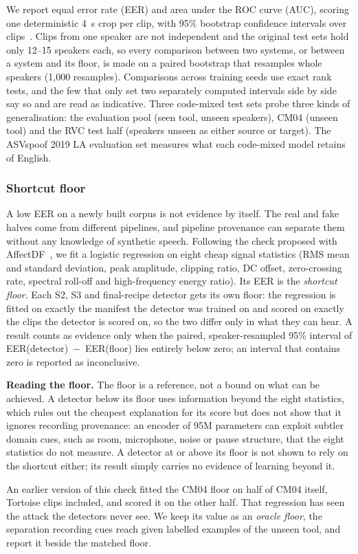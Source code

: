 We report equal error rate (EER) and area under the ROC curve (AUC), scoring one
deterministic 4~s crop per clip, with 95\% bootstrap confidence intervals over
clips~\cite{efron1993bootstrap}. Clips from one speaker are not independent and the
original test sets hold only 12--15 speakers each, so every comparison between two systems, or
between a system and its floor, is made on a paired bootstrap that resamples whole
speakers (1{,}000 resamples). Comparisons across training seeds use exact rank tests, and
the few that only set two separately computed intervals side by side say so and are read
as indicative.
Three code-mixed test sets probe three kinds of generalisation: the evaluation pool
(seen tool, unseen speakers), CM04 (unseen tool) and the RVC test half (speakers
unseen as either source or target). The ASVspoof 2019 LA evaluation set measures
what each code-mixed model retains of English.

\subsubsection{Shortcut floor}
\label{sec:floor}
A low EER on a newly built corpus is not evidence by itself. The real and fake halves
come from different pipelines, and pipeline provenance can separate them without any
knowledge of synthetic speech. Following the check proposed with
AffectDF~\cite{affectdf2026}, we fit a logistic regression on eight cheap signal
statistics (RMS mean and standard deviation, peak amplitude, clipping ratio, DC
offset, zero-crossing rate, spectral roll-off and high-frequency energy ratio). Its
EER is the \emph{shortcut floor}. Each S2, S3 and final-recipe detector gets its own floor: the regression is
fitted on exactly the manifest the detector was trained on and scored on exactly the
clips the detector is scored on, so the two differ only in what they can hear. A
result counts as evidence only when the paired, speaker-resampled 95\% interval of
EER(detector)~$-$~EER(floor) lies entirely below zero; an interval that contains zero
is reported as inconclusive.

\textbf{Reading the floor.} The floor is a reference, not a bound on what can be
achieved. A detector below its floor uses information beyond the eight statistics,
which rules out the cheapest explanation for its score but does not show that it
ignores recording provenance: an encoder of 95M parameters can exploit subtler
domain cues, such as room, microphone, noise or pause structure, that the eight
statistics do not measure. A detector at or above its floor is not shown to rely on
the shortcut either; its result simply carries no evidence of learning beyond it.

An earlier version of this check fitted the CM04 floor on half of CM04 itself,
Tortoise clips included, and scored it on the other half. That regression has seen
the attack the detectors never see. We keep its value as an \emph{oracle floor}, the
separation recording cues reach given labelled examples of the unseen tool, and
report it beside the matched floor.

